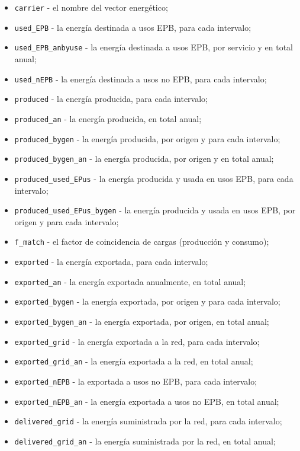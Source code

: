 \documentclass[10pt,notitlepage,oneside,a4paper]{article}
\begin{document}
\begin{itemize}
\item \texttt{carrier} - el nombre del vector energético;
\item \texttt{used\_EPB} - la energía destinada a usos EPB, para cada intervalo;
\item \texttt{used\_EPB\_an\-byuse} - la energía destinada a usos EPB, por servicio y en total anual;
\item \texttt{used\_nEPB} - la energía destinada a usos no EPB, para cada intervalo;
\item \texttt{produced} - la energía producida, para cada intervalo;
\item \texttt{produced\_an} - la energía producida, en total anual;
\item \texttt{produced\_bygen} - la energía producida, por origen y para cada intervalo;
\item \texttt{produced\_bygen\_an} - la energía producida, por origen y en total anual;
\item \texttt{produced\_used\_EPus} - la energía producida y usada en usos EPB, para cada intervalo;
\item \texttt{produced\_used\_EPus\_bygen} - la energía producida y usada en usos EPB, por origen y para cada intervalo;
\item \texttt{f\_match} - el factor de coincidencia de cargas (producción y consumo);
\item \texttt{exported} - la energía exportada, para cada intervalo;
\item \texttt{exported\_an} - la energía exportada anualmente, en total anual;
\item \texttt{exported\_bygen} - la energía exportada, por origen y para cada intervalo;
\item \texttt{exported\_bygen\_an} - la energía exportada, por origen, en total anual;
\item \texttt{exported\_grid} - la energía exportada a la red, para cada intervalo;
\item \texttt{exported\_grid\_an} - la energía exportada a la red, en total anual;
\item \texttt{exported\_nEPB} - la exportada a usos no EPB, para cada intervalo;
\item \texttt{exported\_nEPB\_an} - la energía exportada a usos no EPB, en total anual;
\item \texttt{delivered\_grid} - la energía suministrada por la red, para cada intervalo;
\item \texttt{delivered\_grid\_an} - la energía suministrada por la red, en total anual;

\end{itemize}
\end{document}
